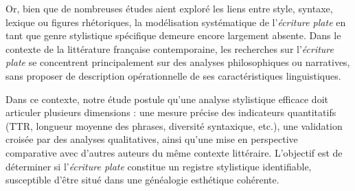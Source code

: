 \par Or, bien que de nombreuses études aient exploré les liens entre style, syntaxe, lexique ou figures rhétoriques, la modélisation systématique de l’\textit{écriture plate} en tant que genre stylistique spécifique demeure encore largement absente. Dans le contexte de la littérature française contemporaine, les recherches sur l’\textit{écriture plate} se concentrent principalement sur des analyses philosophiques ou narratives, sans proposer de description opérationnelle de ses caractéristiques linguistiques.\\

\par Dans ce contexte, notre étude postule qu’une analyse stylistique efficace doit articuler plusieurs dimensions : une mesure précise des indicateurs quantitatifs (TTR, longueur moyenne des phrases, diversité syntaxique, etc.), une validation croisée par des analyses qualitatives, ainsi qu’une mise en perspective comparative avec d’autres auteurs du même contexte littéraire. L’objectif est de déterminer si l’\textit{écriture plate} constitue un registre stylistique identifiable, susceptible d’être situé dans une généalogie esthétique cohérente.

